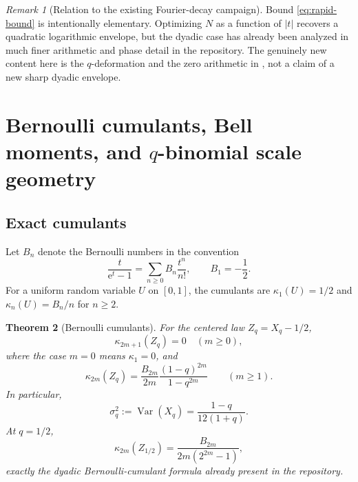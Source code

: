 \documentclass[11pt,oneside]{article}
\newtheorem{theorem}{Theorem}[section]
\theoremstyle{definition}
\theoremstyle{remark}
\newtheorem{remark}[theorem]{Remark}
\newcommand{\Var}{\operatorname{Var}}
\newcommand{\e}{\mathrm e}
\begin{document}
\begin{remark}[Relation to the existing Fourier-decay campaign]
Bound \eqref{eq:rapid-bound} is intentionally elementary.  Optimizing $N$ as a function of
$|t|$ recovers a quadratic logarithmic envelope, but the dyadic case has already been
analyzed in much finer arithmetic and phase detail in the repository.  The genuinely new
content here is the $q$-deformation and the zero arithmetic in , not a claim
of a new sharp dyadic envelope.
\end{remark}

\section{Bernoulli cumulants, Bell moments, and \texorpdfstring{$q$}{q}-binomial scale geometry}
\label{sec:bell}

\subsection{Exact cumulants}

Let $B_n$ denote the Bernoulli numbers in the convention
\[
 \frac{t}{\e^t-1}=\sum_{n\ge0}B_n\frac{t^n}{n!},
 \qquad B_1=-\frac12.
\]
For a uniform random variable $U$ on $[0,1]$, the cumulants are
$\kappa_1(U)=1/2$ and $\kappa_n(U)=B_n/n$ for $n\ge2$.

\begin{theorem}[Bernoulli cumulants]
\label{thm:cumulants}
For the centered law $Z_q=X_q-1/2$,
\begin{equation}
 \kappa_{2m+1}(Z_q)=0\quad(m\ge0),                            \label{eq:odd-cumulants}
\end{equation}
where the case $m=0$ means $\kappa_1=0$, and
\begin{equation}
 \boxed{\displaystyle
 \kappa_{2m}(Z_q)
 =\frac{B_{2m}}{2m}\frac{(1-q)^{2m}}{1-q^{2m}}}
 \qquad(m\ge1).                                             \label{eq:q-cumulants}
\end{equation}
In particular,
\begin{equation}
 \sigma_q^2:=\Var(X_q)=\frac{1-q}{12(1+q)}.                  \label{eq:variance}
\end{equation}
At $q=1/2$,
\begin{equation}
 \kappa_{2m}(Z_{1/2})
 =\frac{B_{2m}}{2m(2^{2m}-1)},                               \label{eq:dyadic-cumulants}
\end{equation}
exactly the dyadic Bernoulli-cumulant formula already present in the repository.
\end{theorem}
\end{document}

